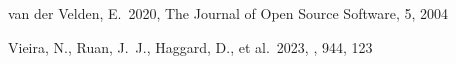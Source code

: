 \documentclass[twocolumn, twocolappendix]{aastex63}
\begin{document}
\begin{thebibliography}{}










 van der Velden, E.\ 2020, The Journal of Open Source Software, 5, 2004




 Vieira, N., Ruan, J.~J., Haggard, D., et al.\ 2023, \apj, 944, 123














\end{thebibliography}
\end{document}
